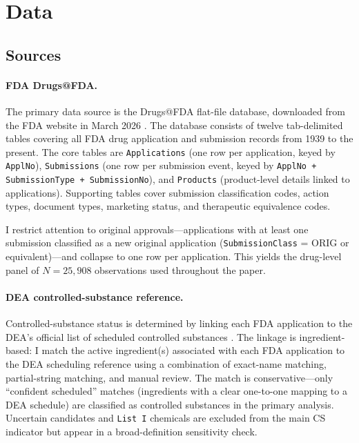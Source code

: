 \section{Data}
\label{sec:data}

\subsection{Sources}

\paragraph{FDA Drugs@FDA.}
The primary data source is the Drugs@FDA flat-file database, downloaded from the FDA website in March 2026 \parencite{researchDrugsFDADataFiles2026}. The database consists of twelve tab-delimited tables covering all FDA drug application and submission records from 1939 to the present. The core tables are \texttt{Applications} (one row per application, keyed by \texttt{ApplNo}), \texttt{Submissions} (one row per submission event, keyed by \texttt{ApplNo + SubmissionType + SubmissionNo}), and \texttt{Products} (product-level details linked to applications). Supporting tables cover submission classification codes, action types, document types, marketing status, and therapeutic equivalence codes.

I restrict attention to original approvals---applications with at least one submission classified as a new original application (\texttt{SubmissionClass} = ORIG or equivalent)---and collapse to one row per application. This yields the drug-level panel of $N = 25{,}908$ observations used throughout the paper.

\paragraph{DEA controlled-substance reference.}
Controlled-substance status is determined by linking each FDA application to the DEA's official list of scheduled controlled substances \parencite{DrugScheduling}. The linkage is ingredient-based: I match the active ingredient(s) associated with each FDA application to the DEA scheduling reference using a combination of exact-name matching, partial-string matching, and manual review. The match is conservative---only ``confident scheduled'' matches (ingredients with a clear one-to-one mapping to a DEA schedule) are classified as controlled substances in the primary analysis. Uncertain candidates and \texttt{List~I} chemicals are excluded from the main CS indicator but appear in a broad-definition sensitivity check.

